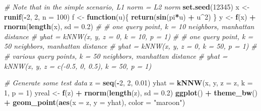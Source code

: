 \documentclass[]{article}
\newenvironment{Shaded}{\begin{snugshade}}{\end{snugshade}}
\newcommand{\KeywordTok}[1]{\textcolor[rgb]{0.13,0.29,0.53}{\textbf{#1}}}
\newcommand{\DataTypeTok}[1]{\textcolor[rgb]{0.13,0.29,0.53}{#1}}
\newcommand{\DecValTok}[1]{\textcolor[rgb]{0.00,0.00,0.81}{#1}}
\newcommand{\FloatTok}[1]{\textcolor[rgb]{0.00,0.00,0.81}{#1}}
\newcommand{\StringTok}[1]{\textcolor[rgb]{0.31,0.60,0.02}{#1}}
\newcommand{\CommentTok}[1]{\textcolor[rgb]{0.56,0.35,0.01}{\textit{#1}}}
\newcommand{\ControlFlowTok}[1]{\textcolor[rgb]{0.13,0.29,0.53}{\textbf{#1}}}
\newcommand{\OperatorTok}[1]{\textcolor[rgb]{0.81,0.36,0.00}{\textbf{#1}}}
\newcommand{\NormalTok}[1]{#1}
\begin{document}
\begin{Shaded}
\begin{Highlighting}[]
\CommentTok{# Note that in the simple scenario, L1 norm = L2 norm}
\KeywordTok{set.seed}\NormalTok{(}\DecValTok{12345}\NormalTok{)}
\NormalTok{x <-}\StringTok{ }\KeywordTok{runif}\NormalTok{(}\OperatorTok{-}\DecValTok{2}\NormalTok{, }\DecValTok{2}\NormalTok{, }\DataTypeTok{n =} \DecValTok{100}\NormalTok{) }
\NormalTok{f <-}\StringTok{ }\ControlFlowTok{function}\NormalTok{(u)\{}
  \KeywordTok{return}\NormalTok{(}\KeywordTok{sin}\NormalTok{(pi}\OperatorTok{*}\NormalTok{u) }\OperatorTok{+}\StringTok{ }\NormalTok{u}\OperatorTok{^}\DecValTok{2}\NormalTok{)}
\NormalTok{\}}
\NormalTok{y <-}\StringTok{ }\KeywordTok{f}\NormalTok{(x) }\OperatorTok{+}\StringTok{ }\KeywordTok{rnorm}\NormalTok{(}\KeywordTok{length}\NormalTok{(x), }\DataTypeTok{sd =} \FloatTok{0.2}\NormalTok{)}
\CommentTok{# # one query point, k = 10 neighbors, manhattan distance}
\CommentTok{# yhat = kNNW(x, y, z = 0, k = 10, p = 1)}
\CommentTok{# # one query point, k = 50 neighbors, manhattan distance}
\CommentTok{# yhat = kNNW(x, y, z = 0, k = 50, p = 1)}
\CommentTok{# # various query points, k = 50 neighbors, manhattan distance}
\CommentTok{# yhat = kNNW(x, y, z = c(-0.5, 0, 0.5), k = 50, p = 1)}
\end{Highlighting}
\end{Shaded}

\begin{Shaded}
\begin{Highlighting}[]
\CommentTok{# Generate some test data}
\NormalTok{z =}\StringTok{ }\KeywordTok{seq}\NormalTok{(}\OperatorTok{-}\DecValTok{2}\NormalTok{, }\DecValTok{2}\NormalTok{, }\FloatTok{0.01}\NormalTok{)}
\NormalTok{yhat =}\StringTok{ }\KeywordTok{kNNW}\NormalTok{(x, y, }\DataTypeTok{z =}\NormalTok{ z, }\DataTypeTok{k =} \DecValTok{1}\NormalTok{, }\DataTypeTok{p =} \DecValTok{1}\NormalTok{)}
\NormalTok{yreal <-}\StringTok{ }\KeywordTok{f}\NormalTok{(z) }\OperatorTok{+}\StringTok{ }\KeywordTok{rnorm}\NormalTok{(}\KeywordTok{length}\NormalTok{(z), }\DataTypeTok{sd =} \FloatTok{0.2}\NormalTok{)}
\KeywordTok{ggplot}\NormalTok{() }\OperatorTok{+}\StringTok{ }\KeywordTok{theme_bw}\NormalTok{() }\OperatorTok{+}
\StringTok{  }\KeywordTok{geom_point}\NormalTok{(}\KeywordTok{aes}\NormalTok{(}\DataTypeTok{x =}\NormalTok{ z, }\DataTypeTok{y =}\NormalTok{ yhat), }\DataTypeTok{color =} \StringTok{"maroon"}\NormalTok{)}
\end{Highlighting}
\end{Shaded}
\end{document}
